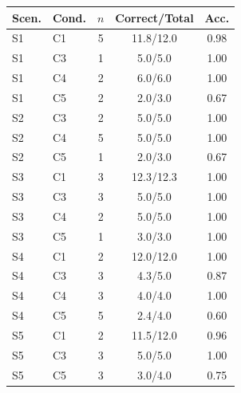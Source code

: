 \begin{table}[t]
\begin{minipage}[t]{0.48\textwidth}
\scriptsize
\setlength{\tabcolsep}{0pt}
\begin{tabular*}{\linewidth}{@{\extracolsep{\fill}}llccc}
\toprule
\textbf{Scen.} & \textbf{Cond.} & \textbf{$n$} & \textbf{Correct/Total} & \textbf{Acc.} \\
\midrule
S1 & C1 & 5 & 11.8/12.0 & 0.98 \\
S1 & C3 & 1 & 5.0/5.0 & 1.00 \\
S1 & C4 & 2 & 6.0/6.0 & 1.00 \\
S1 & C5 & 2 & 2.0/3.0 & 0.67 \\
S2 & C3 & 2 & 5.0/5.0 & 1.00 \\
S2 & C4 & 5 & 5.0/5.0 & 1.00 \\
S2 & C5 & 1 & 2.0/3.0 & 0.67 \\
S3 & C1 & 3 & 12.3/12.3 & 1.00 \\
S3 & C3 & 3 & 5.0/5.0 & 1.00 \\
S3 & C4 & 2 & 5.0/5.0 & 1.00 \\
S3 & C5 & 1 & 3.0/3.0 & 1.00 \\
S4 & C1 & 2 & 12.0/12.0 & 1.00 \\
S4 & C3 & 3 & 4.3/5.0 & 0.87 \\
S4 & C4 & 3 & 4.0/4.0 & 1.00 \\
S4 & C5 & 5 & 2.4/4.0 & 0.60 \\
S5 & C1 & 2 & 11.5/12.0 & 0.96 \\
S5 & C3 & 3 & 5.0/5.0 & 1.00 \\
S5 & C5 & 3 & 3.0/4.0 & 0.75 \\
\bottomrule
\end{tabular*}
\end{minipage}
\end{table}
